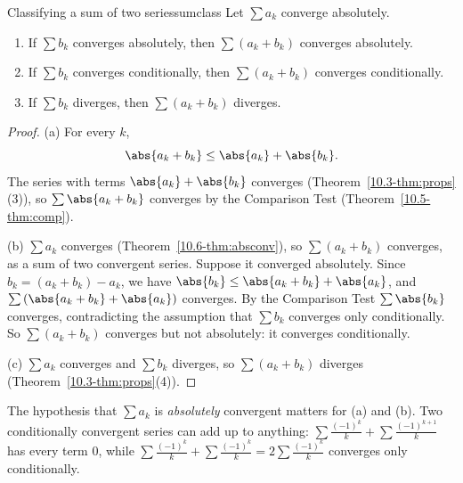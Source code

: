 \documentclass[11pt]{article}
\begin{document}
\begin{thm}{Classifying a sum of two series}{sumclass}
Let $\sum a_k$ converge absolutely.
\begin{enumerate}[label=(\alph*)]
  \item If $\sum b_k$ converges absolutely, then $\sum(a_k+b_k)$ converges absolutely.
  \item If $\sum b_k$ converges conditionally, then $\sum(a_k+b_k)$ converges conditionally.
  \item If $\sum b_k$ diverges, then $\sum(a_k+b_k)$ diverges.
\end{enumerate}
\end{thm}
\begin{proof}
(a) For every $k$,
\[
\abs{a_k+b_k}\le\abs{a_k}+\abs{b_k}.
\]
The series with terms $\abs{a_k}+\abs{b_k}$ converges (Theorem~\ref{10.3-thm:props}(3)), so $\sum\abs{a_k+b_k}$ converges by the Comparison Test (Theorem~\ref{10.5-thm:comp}).

(b) $\sum a_k$ converges (Theorem~\ref{10.6-thm:absconv}), so $\sum(a_k+b_k)$ converges, as a sum of two convergent series. Suppose it converged absolutely. Since $b_k=(a_k+b_k)-a_k$, we have $\abs{b_k}\le\abs{a_k+b_k}+\abs{a_k}$, and $\sum\left(\abs{a_k+b_k}+\abs{a_k}\right)$ converges. By the Comparison Test $\sum\abs{b_k}$ converges, contradicting the assumption that $\sum b_k$ converges only conditionally. So $\sum(a_k+b_k)$ converges but not absolutely: it converges conditionally.

(c) $\sum a_k$ converges and $\sum b_k$ diverges, so $\sum(a_k+b_k)$ diverges (Theorem~\ref{10.3-thm:props}(4)).
\end{proof}

The hypothesis that $\sum a_k$ is \emph{absolutely} convergent matters for (a) and (b). Two conditionally convergent series can add up to anything: $\sum\frac{(-1)^k}k+\sum\frac{(-1)^{k+1}}k$ has every term $0$, while $\sum\frac{(-1)^k}k+\sum\frac{(-1)^k}k=2\sum\frac{(-1)^k}k$ converges only conditionally.
\end{document}
